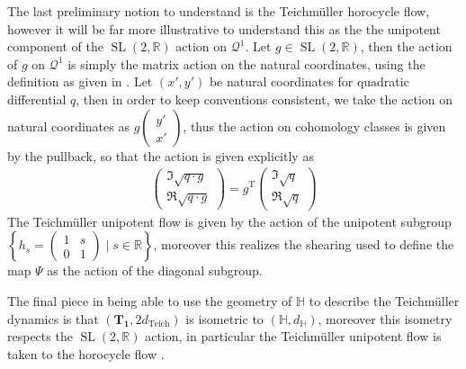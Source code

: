 \documentclass{article}
\newcommand{\set}[1]{\left\{#1\right\}}
\newcommand{\slr}{\operatorname{SL}(2,\mathbb{R})}
\begin{document}
        The last preliminary notion to understand is the Teichm\"uller horocycle flow, however it will be far more illustrative to understand this as the the unipotent component of the \(\slr\) action on \(\mathcal{Q}^1\). Let \(g \in \slr\), then the action of \(g\) on \(\mathcal{Q}^1\) is simply the matrix action on the natural coordinates, using the definition as given in \cite{Forni_2006}. Let \((x',y')\) be natural coordinates for quadratic differential \(q\), then in order to keep conventions consistent, we take the action on natural coordinates as \(g\begin{pmatrix}
            y' \\ x'
        \end{pmatrix}\), thus the action on cohomology classes is given by the pullback, so that the action is given explicitly as
        \begin{align*}
            \begin{pmatrix} \Im\sqrt{q\cdot g} \\ \Re\sqrt{q \cdot g} \end{pmatrix} = g^{\operatorname{T}}\begin{pmatrix} \Im\sqrt{q} \\ \Re\sqrt{q} \end{pmatrix}
        \end{align*}
        The Teichm\"uller unipotent flow is given by the action of the unipotent subgroup \(\set{h_s = \begin{pmatrix} 1 & s \\ 0 & 1 \end{pmatrix}\mid s \in \mathbb{R}}\), moreover this realizes the shearing used to define the map \(\Psi\) as the action of the diagonal subgroup.

        The final piece in being able to use the geometry of \(\mathbb{H}\) to describe the Teichm\"uller dynamics is that \((\mathbf{T_1},2d_{\operatorname{Teich}})\) is isometric to \((\mathbb{H},d_\mathbb{H})\), moreover this isometry respects the \(\slr\) action, in particular the Teichm\"uller unipotent flow is taken to the horocycle flow \cite{FarbMarg}.
\end{document}
